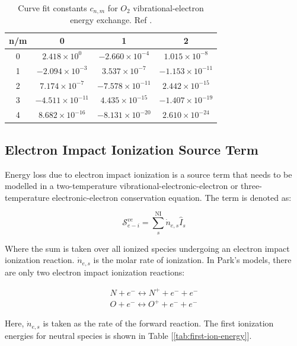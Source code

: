 \documentclass[10pt]{article}
\begin{document}
\begin{flushleft}
\begin{table}[h!]
\centering
\begin{tabular}{cccc}
\hline
n/m & 0 & 1 & 2 \\
\hline
0 & $2.418 \times 10^0$ & $-2.660 \times 10^{-4}$ & $1.015 \times 10^{-8}$ \\
1 & $-2.094 \times 10^{-3}$ & $3.537 \times 10^{-7}$ & $-1.153 \times 10^{-11}$ \\
2 & $7.174 \times 10^{-7}$ & $-7.578 \times 10^{-11}$ & $2.442 \times 10^{-15}$ \\
3 &$ -4.511 \times 10^{-11}$ & $4.435 \times 10^{-15}$ & $-1.407 \times 10^{-19}$ \\
4 & $8.682 \times 10^{-16}$ & $-8.131 \times 10^{-20}$ & $2.610 \times 10^{-24}$ \\
\hline
\end{tabular}
\caption{Curve fit constants $c_{n,m}$ for $O_2$ vibrational-electron energy exchange. Ref \cite{laporta2016}.}
\label{tab:o2-electron-constants}
\end{table}


\subsection{Electron Impact Ionization Source Term}
\label{sec:el_ion_source}
Energy loss due to electron impact ionization is a source term that needs to be modelled in a two-temperature vibrational-electronic-electron or three-temperature electronic-electron conservation equation. The term is denoted as:

\begin{equation*}
    \mathcal{S}_{e-i}^{ve} = \sum_{s}^\text{NI} \dot{n}_{e,s} \hat{I}_s
\end{equation*}

Where the sum is taken over all ionized species undergoing an electron impact ionization reaction. $\dot{n}_{e,s}$ is the molar rate of ionization. In Park's models, there are only two electron impact ionization reactions:

\begin{align*}
    N + e^- \leftrightarrow N^+ + e^- + e^- \\
    O + e^- \leftrightarrow O^+ + e^- + e^-
\end{align*}

Here, $\dot{n}_{e,s}$ is taken as the rate of the forward reaction. The first ionization energies for neutral species is shown in Table [\ref{tab:first-ion-energy}].


\end{flushleft}
\end{document}
